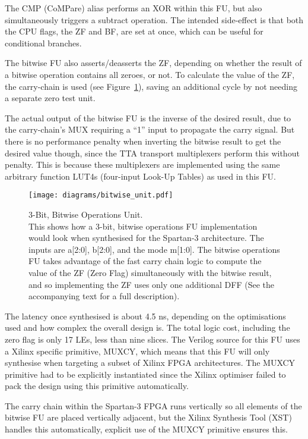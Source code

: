 The CMP (CoMPare) alias performs an XOR within this FU, but also simultaneously
triggers a subtract operation. The intended side-effect is that both the CPU
flags, the ZF and BF, are set at once, which can be useful for conditional
branches.

The bitwise FU also asserts/deasserts the ZF, depending on whether the result
of a bitwise operation contains all zeroes, or not. To calculate the value of
the ZF, the carry-chain is used (see Figure~\ref{CPU_Bitwise_Unit}), saving an
additional cycle by not needing a separate zero test unit.

The actual output of the bitwise FU is the inverse of the desired result, due to
the carry-chain's MUX requiring a ``1'' input to propagate the carry signal. But
there is no performance penalty when inverting the bitwise result to get the
desired value though, since the TTA transport multiplexers perform this without
penalty. This is because these multiplexers are implemented using the same
arbitrary function LUT4s (four-input Look-Up Tables) as used in this FU.

\begin{figure}[h!]
\begin{center}
\texttt{[image: diagrams/bitwise\_unit.pdf]}
\caption[3-Bit, Bitwise Operations Unit]{3-Bit, Bitwise Operations Unit. \\
This shows how a 3-bit, bitwise operations FU implementation would look when
synthesised for the Spartan-3 architecture. The inputs are a[2:0], b[2:0],
and the mode m[1:0]. The bitwise operations FU takes advantage of the fast
carry chain logic to compute the value of the ZF (Zero Flag) simultaneously
with the bitwise result, and so implementing the ZF uses only one additional
DFF (See the accompanying text for a full description).}
\label{CPU_Bitwise_Unit}
\end{center}
\end{figure}

The latency once synthesised is about 4.5 ns, depending on the optimisations used
and how complex the overall design is. The total logic cost, including the zero
flag is only 17 LEs, less than nine slices. The Verilog source for this FU uses a
Xilinx specific primitive, MUXCY, which means that this FU will only synthesise
when targeting a subset of Xilinx FPGA architectures. The MUXCY primitive had to
be explicitly instantiated since the Xilinx optimiser failed to pack the design
using this primitive automatically.

The carry chain within the Spartan-3 FPGA runs vertically so all elements of the
bitwise FU are placed vertically adjacent, but the Xilinx Synthesis
Tool (XST) handles this
automatically, explicit use of the MUXCY primitive ensures this.

